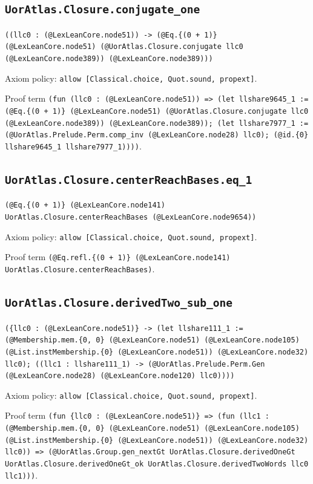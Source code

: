 \documentclass[11pt]{article}
\begin{document}
\subsection*{\texttt{UorAtlas.Closure.conjugate\_one}}
\noindent\texttt{((llc0 : (@LexLeanCore.node51)) -> (@Eq.\{(0 + 1)\} (@LexLeanCore.node51) (@UorAtlas.Closure.conjugate llc0 (@LexLeanCore.node389)) (@LexLeanCore.node389)))}\par
\noindent Axiom policy: \texttt{allow [Classical.choice, Quot.sound, propext]}.\par
\noindent Proof term \texttt{(fun (llc0 : (@LexLeanCore.node51)) => (let llshare9645\_1 := (@Eq.\{(0 + 1)\} (@LexLeanCore.node51) (@UorAtlas.Closure.conjugate llc0 (@LexLeanCore.node389)) (@LexLeanCore.node389)); (let llshare7977\_1 := (@UorAtlas.Prelude.Perm.comp\_inv (@LexLeanCore.node28) llc0); (@id.\{0\} llshare9645\_1 llshare7977\_1))))}.\par
\subsection*{\texttt{UorAtlas.Closure.centerReachBases.eq\_1}}
\noindent\texttt{(@Eq.\{(0 + 1)\} (@LexLeanCore.node141) UorAtlas.Closure.centerReachBases (@LexLeanCore.node9654))}\par
\noindent Axiom policy: \texttt{allow [Classical.choice, Quot.sound, propext]}.\par
\noindent Proof term \texttt{(@Eq.refl.\{(0 + 1)\} (@LexLeanCore.node141) UorAtlas.Closure.centerReachBases)}.\par
\subsection*{\texttt{UorAtlas.Closure.derivedTwo\_sub\_one}}
\noindent\texttt{(\{llc0 : (@LexLeanCore.node51)\} -> (let llshare111\_1 := (@Membership.mem.\{0, 0\} (@LexLeanCore.node51) (@LexLeanCore.node105) (@List.instMembership.\{0\} (@LexLeanCore.node51)) (@LexLeanCore.node32) llc0); ((llc1 : llshare111\_1) -> (@UorAtlas.Prelude.Perm.Gen (@LexLeanCore.node28) (@LexLeanCore.node120) llc0))))}\par
\noindent Axiom policy: \texttt{allow [Classical.choice, Quot.sound, propext]}.\par
\noindent Proof term \texttt{(fun \{llc0 : (@LexLeanCore.node51)\} => (fun (llc1 : (@Membership.mem.\{0, 0\} (@LexLeanCore.node51) (@LexLeanCore.node105) (@List.instMembership.\{0\} (@LexLeanCore.node51)) (@LexLeanCore.node32) llc0)) => (@UorAtlas.Group.gen\_nextGt UorAtlas.Closure.derivedOneGt UorAtlas.Closure.derivedOneGt\_ok UorAtlas.Closure.derivedTwoWords llc0 llc1)))}.\par
\end{document}
